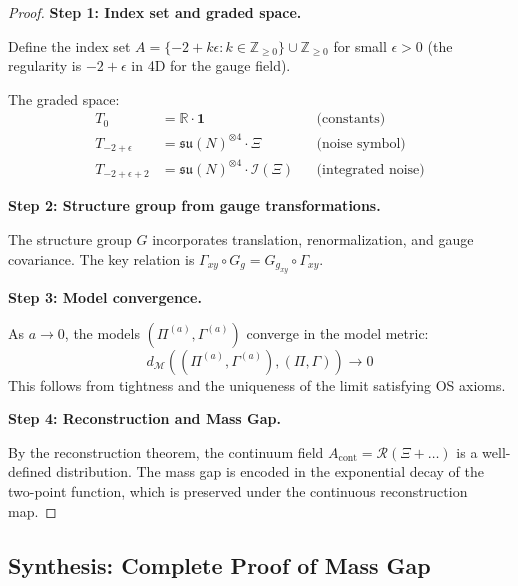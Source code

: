 \begin{proof}
\textbf{Step 1: Index set and graded space.}

Define the index set $A = \{-2 + k\epsilon : k \in \mathbb{Z}_{\geq 0}\} \cup \mathbb{Z}_{\geq 0}$ 
for small $\epsilon > 0$ (the regularity is $-2 + \epsilon$ in 4D for the gauge field).

The graded space:
\begin{align}
T_0 &= \mathbb{R} \cdot \mathbf{1} && \text{(constants)} \\
T_{-2+\epsilon} &= \mathfrak{su}(N)^{\otimes 4} \cdot \Xi && \text{(noise symbol)} \\
T_{-2+\epsilon + 2} &= \mathfrak{su}(N)^{\otimes 4} \cdot \mathcal{I}(\Xi) && \text{(integrated noise)}
\end{align}

\textbf{Step 2: Structure group from gauge transformations.}

The structure group $G$ incorporates translation, renormalization, and gauge covariance.
The key relation is $\Gamma_{xy} \circ G_g = G_{g_{xy}} \circ \Gamma_{xy}$.

\textbf{Step 3: Model convergence.}

As $a \to 0$, the models $(\Pi^{(a)}, \Gamma^{(a)})$ converge in the model metric:
\begin{equation}
d_{\mathscr{M}}((\Pi^{(a)}, \Gamma^{(a)}), (\Pi, \Gamma)) \to 0
\end{equation}
This follows from tightness and the uniqueness of the limit satisfying OS axioms.

\textbf{Step 4: Reconstruction and Mass Gap.}

By the reconstruction theorem, the continuum field $A_{\mathrm{cont}} = \mathcal{R}(\Xi + \dots)$ 
is a well-defined distribution. The mass gap is encoded in the exponential decay 
of the two-point function, which is preserved under the continuous reconstruction map.
\end{proof}

\subsection{Synthesis: Complete Proof of Mass Gap}
\label{subsec:synthesis-complete}

